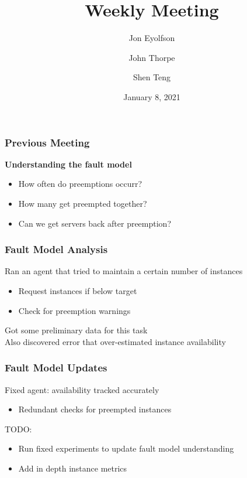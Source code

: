 
\title{Weekly Meeting}
\date{January 8, 2021}
\author{Jon Eyolfson \and John Thorpe \and Shen Teng}



  \begin{frame}[plain]
    \titlepage
  \end{frame}

  \setcounter{framenumber}{0}

  \begin{frame}
    \frametitle{Previous Meeting}
    \textbf{Understanding the fault model}
    \begin{itemize}
      \item How often do preemptions occurr?
      \item How many get preempted together?
      \item Can we get servers back after preemption?
    \end{itemize}

  \end{frame}

  \begin{frame}
    \frametitle{Fault Model Analysis}

    Ran an agent that tried to maintain a certain number of instances \\
    \begin{itemize}
      \item Request instances if below target
      \item Check for preemption warnings
    \end{itemize}

    \vspace{1em}
    Got some preliminary data for this task \\
    Also discovered error that over-estimated instance availability
  \end{frame}

  \begin{frame}
    \frametitle{Fault Model Updates}

    Fixed agent: availability tracked accurately
    \begin{itemize}
      \item Redundant checks for preempted instances
    \end{itemize}

    \vspace{1em}
    TODO:
    \begin{itemize}
      \item Run fixed experiments to update fault model understanding
      \item Add in depth instance metrics
    \end{itemize}
  \end{frame}

